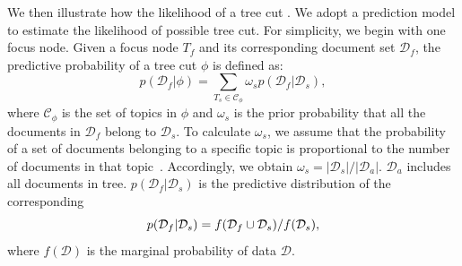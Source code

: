 We then illustrate how the likelihood of a tree cut .
We adopt a prediction model to estimate the likelihood of  possible tree cut.
For simplicity, we begin with one focus node. %
Given a focus node $T_f$ and its corresponding document set $\mathcal{D}_f$, the predictive probability of a tree cut $\phi$ is defined as: %
\begin{equation}
p(\mathcal{D}_f|\phi) = \sum_{T_s\in \mathcal{C}_{\phi}} \omega_s p(\mathcal{D}_f|\mathcal{D}_s),
\end{equation}
where $\mathcal{C}_{\phi}$ is the set of topics in $\phi$ and $\omega_s$ is the prior probability that all the documents in $\mathcal{D}_f$ belong to $\mathcal{D}_s$.
To calculate $\omega_s$, we assume that the probability of a set of documents belonging to a specific topic is proportional to the number of documents in that topic~\cite{Blundell2011}.
Accordingly, we obtain $\omega_s = {|\mathcal{D}_s|}/{|\mathcal{D}_a|}$.
$\mathcal{D}_a$ includes all documents in  tree.
$p(\mathcal{D}_f|\mathcal{D}_s)$ is the predictive distribution of the corresponding 
\begin{equation}
\small
p(\mathcal{D}_f|\mathcal{D}_s) = {f(\mathcal{D}_f \cup \mathcal{D}_s)}/{f(\mathcal{D}_s)},
\end{equation}
where $f(\mathcal{D})$ is the marginal probability of data $\mathcal{D}$.

